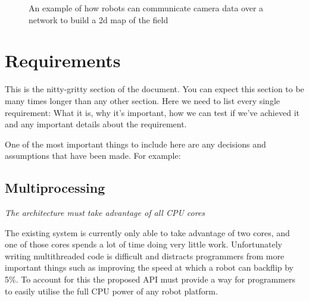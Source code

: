 \documentclass[english,12pt]{scrartcl}
\newcommand{\requirement}[1]{\textit{#1}}
\begin{document}
\begin{figure}[b]
                \caption {An example of how robots can communicate camera data over a network to
                    build a 2d map of the field}
                    \label{fig:NetworkExampleDiagram}
            \end{figure}
            

    \section{Requirements}
        This is the nitty-gritty section of the document. You can expect this section to be many
        times longer than any other section. Here we need to list every single requirement: What it
        is, why it's important, how we can test if we've achieved it and any important details about
        the requirement.
        
        One of the most important things to include here are any decisions and assumptions that have
        been made. For example:
        
        \subsection{Multiprocessing}
            \requirement{The architecture must take advantage of all CPU cores}
            
            The existing system is currently only able to take advantage of two cores, and one of
            those cores spends a lot of time doing very little work. Unfortunately writing
            multithreaded code is difficult and distracts programmers from more important things
            such as improving the speed at which a robot can backflip by 5\%. To account for this
            the proposed API must provide a way for programmers to easily utilise the full CPU power
            of any robot platform.
            
\end{document}

